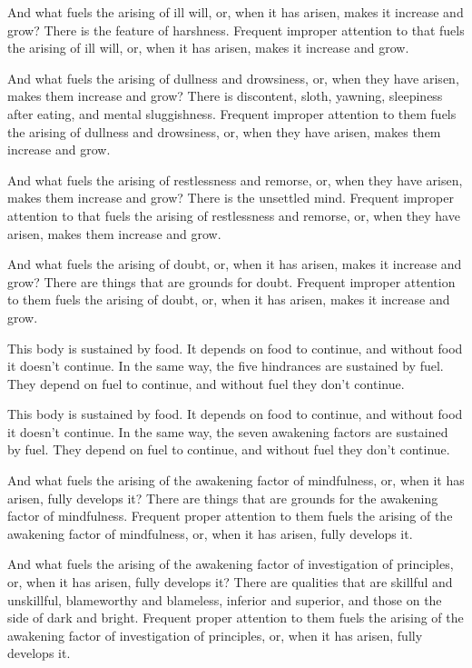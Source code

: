 \documentclass[12pt,openany]{book}%
\begin{document}
And what fuels the arising of ill will, or, when it has arisen, makes it increase and grow? There is the feature of harshness. Frequent improper attention to that fuels the arising of ill will, or, when it has arisen, makes it increase and grow. 

And what fuels the arising of dullness and drowsiness, or, when they have arisen, makes them increase and grow? There is discontent, sloth, yawning, sleepiness after eating, and mental sluggishness. Frequent improper attention to them fuels the arising of dullness and drowsiness, or, when they have arisen, makes them increase and grow. 

And what fuels the arising of restlessness and remorse, or, when they have arisen, makes them increase and grow? There is the unsettled mind. Frequent improper attention to that fuels the arising of restlessness and remorse, or, when they have arisen, makes them increase and grow. 

And what fuels the arising of doubt, or, when it has arisen, makes it increase and grow? There are things that are grounds for doubt. Frequent improper attention to them fuels the arising of doubt, or, when it has arisen, makes it increase and grow. 

This body is sustained by food. It depends on food to continue, and without food it doesn’t continue. In the same way, the five hindrances are sustained by fuel. They depend on fuel to continue, and without fuel they don’t continue. 

This body is sustained by food. It depends on food to continue, and without food it doesn’t continue. In the same way, the seven awakening factors are sustained by fuel. They depend on fuel to continue, and without fuel they don’t continue. 

And what fuels the arising of the awakening factor of mindfulness, or, when it has arisen, fully develops it? There are things that are grounds for the awakening factor of mindfulness. Frequent proper attention to them fuels the arising of the awakening factor of mindfulness, or, when it has arisen, fully develops it. 

And what fuels the arising of the awakening factor of investigation of principles, or, when it has arisen, fully develops it? There are qualities that are skillful and unskillful, blameworthy and blameless, inferior and superior, and those on the side of dark and bright. Frequent proper attention to them fuels the arising of the awakening factor of investigation of principles, or, when it has arisen, fully develops it. 
\end{document}
